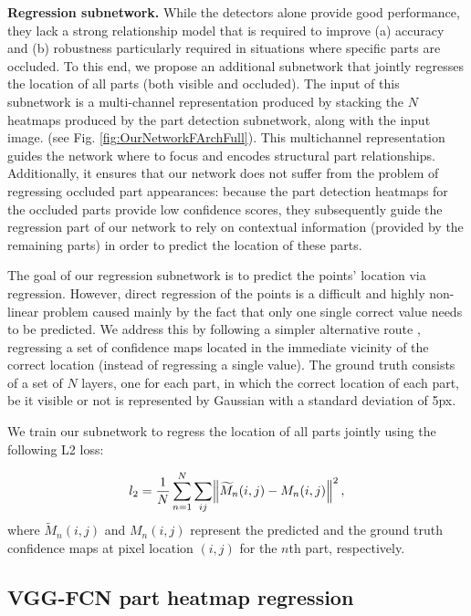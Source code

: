 \documentclass[runningheads]{llncs}
\begin{document}
\textbf{Regression subnetwork.} While the detectors alone provide good performance, they lack a strong relationship model that is required to improve (a) accuracy and (b) robustness particularly required in situations where specific parts are occluded. To this end, we propose an additional subnetwork that jointly regresses the location of all parts (both visible and occluded). The input of this subnetwork is a multi-channel representation produced by stacking the $N$ heatmaps produced by the part detection subnetwork, along with the input image. (see Fig. \ref{fig:OurNetworkFArchFull}). This multichannel representation guides the network where to focus and encodes structural part relationships. Additionally, it ensures that our network does not suffer from the problem of regressing occluded part appearances: because the part detection heatmaps for the occluded parts provide low confidence scores, they subsequently guide the regression part of our network to rely on contextual information (provided by the remaining parts) in order to predict the location of these parts. 

The goal of our regression subnetwork is to predict the points' location via regression. However, direct regression of the points is a difficult and highly non-linear problem caused mainly by the fact that only one single correct value needs to be predicted. We address this by following a simpler alternative route \cite{tompson2014joint, pfister2015flowing}, regressing a set of confidence maps located in the immediate vicinity of the correct location (instead of regressing a single value). The ground truth consists of a set of $ N $ layers, one for each part, in which the correct location of each part, be it visible or not is represented by Gaussian with a standard deviation of 5px.

We train our subnetwork to regress the location of all parts jointly using the following L2 loss:
 
\begin{equation}
	l_2 = \dfrac{1}{N} \sum\limits_{n=1}^{N} \sum\limits_{ij} \norm{\widetilde{M}_{n}(i,j)-M_n(i,j)}^2, 
\end{equation}
where $ \widetilde{M}_{n}(i,j)$ and $ M_n (i,j)$ represent the predicted and the ground truth confidence maps at pixel location $ (i,j) $ for the $ n $th part, respectively.

\subsection{VGG-FCN part heatmap regression}
\end{document}
